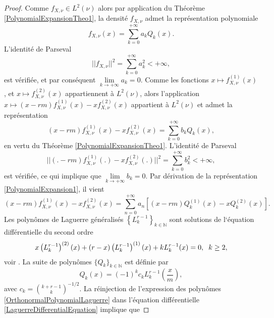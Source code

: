 \begin{proof}
Comme $f_{X,\nu}\in L^{2}(\nu)$ alors par application du Théorème \ref{PolynomialExpansionTheo1}, la densité $f_{X,\nu}$ admet la représentation polynomiale
\begin{equation}\label{PolynomialExpansion1}
f_{X,\nu}(x)=\sum_{k=0}^{+\infty}a_{k}Q_{k}(x).
\end{equation}
L\rq{}identité de Parseval 
\begin{equation*}
||f_{X,\nu}||^{2}=\sum_{k=0}^{+\infty}a_{k}^{2}<+\infty,
\end{equation*} 
est vérifiée, et par conséquent $\underset{k\rightarrow+\infty}{\lim} a_{k}=0$. Comme les fonctions $x\mapsto f^{(1)}_{X,\nu}(x)$, et $x\mapsto f^{(2)}_{X,\nu}(x)$ appartiennent à $L^{2}(\nu)$,  alors l'application $x\mapsto (x-rm)f^{(1)}_{X,\nu}(x)-x f^{(2)}_{X,\nu}(x)$ appartient à $L^{2}(\nu)$ et admet la représentation
\begin{equation}\label{PolynomialExpansion2}
(x-rm)f^{(1)}_{X,\nu}(x)-xf^{(2)}_{X,\nu}(x)=\sum_{k=0}^{+\infty}b_{k}Q_{k}(x),
\end{equation}
en vertu du Théorème \ref{PolynomialExpansionTheo1}. L\rq{}identité de Parseval 
\begin{equation*}
||(.-rm)f^{(1)}_{X,\nu}(.)-xf^{(2)}_{X,\nu}(.)||^{2}=\sum_{k=0}^{+\infty}b_{k}^{2}<+\infty,
\end{equation*} 
est vérifiée, ce qui implique que $\underset{k\rightarrow+\infty}{\lim} b_{k}=0$. Par dérivation de la représentation \eqref{PolynomialExpansion1}, il vient 
\begin{equation}\label{PolynomialExpansion3}
(x-rm)f^{(1)}_{X,\nu}(x)-xf^{(2)}_{X,\nu}(x)=\sum_{n=0}^{+\infty}a_{n}\left[(x-rm)Q_{k}^{(1)}(x)-xQ_{k}^{(2)}(x)\right].
\end{equation}
Les polynômes de Laguerre généralisés $\left\{L_{k}^{r-1}\right\}_{k\in\mathbb{N}}$  sont solutions de l\lq{}équation différentielle du second ordre
\begin{equation}\label{LaguerreDifferentialEquation}
x\left(L_{k}^{r-1}\right)^{(2)}(x)+(r-x)\left(L_{k}^{r-1}\right)^{(1)}(x)+kL_{k}^{r-1}(x)=0, \hspace{0.2cm}k\geq2,
\end{equation}
voir \citet{Sz39}. La suite de polynômes $\{Q_{k}\}_{k\in\mathbb{N}}$ est définie par 
\begin{equation}\label{OrthonormalPolynomialLaguerre}
Q_{k}(x)=(-1)^{k}c_{k}L_{k}^{r-1}\left(\frac{x}{m}\right), 
\end{equation}
avec $c_{k}=\binom{k+r-1}{k}^{-1/2}$. La réinjection de l'expression des polynômes \eqref{OrthonormalPolynomialLaguerre} dans l'équation différentielle \eqref{LaguerreDifferentialEquation} implique que 

\end{proof}
